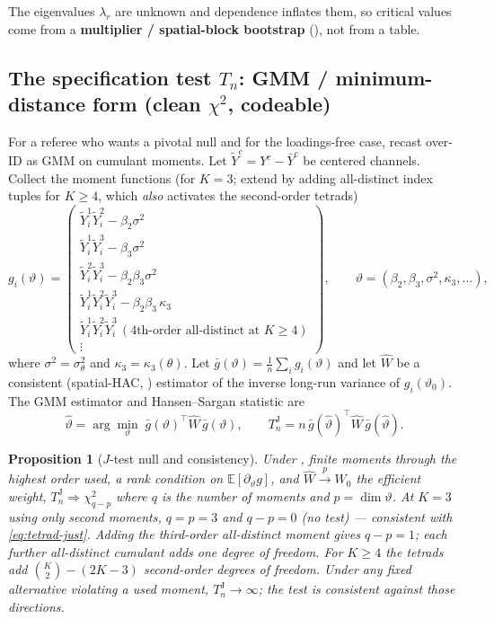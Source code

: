 \documentclass[11pt]{article}
\newtheorem{proposition}{Proposition}
\theoremstyle{definition}
\newcommand{\E}{\mathbb{E}}
\newcommand{\wto}{\Rightarrow}
\newcommand{\cyto}{\overset{p}{\to}}
\newcommand{\Th}{\theta}
\newcommand{\lat}{\Th}
\begin{document}
The eigenvalues $\lambda_r$ are unknown and dependence inflates them, so
critical values come from a \textbf{multiplier / spatial-block bootstrap}
(), not from a table.

\subsection{The specification test $T_n$: GMM / minimum-distance form
(clean $\chi^2$, codeable)}\label{sec:testGMM}

For a referee who wants a pivotal null and for the loadings-free case, recast
over-ID as GMM on cumulant moments. Let $\tilde Y^c=Y^c-\bar Y^c$ be centered
channels. Collect the moment functions (for $K=3$; extend by adding
all-distinct index tuples for $K\ge4$, which \emph{also} activates the
second-order tetrads)
\[
  g_i(\vartheta)=
  \begin{pmatrix}
   \tilde Y^1_i\tilde Y^2_i-\beta_2\sigma^2\\
   \tilde Y^1_i\tilde Y^3_i-\beta_3\sigma^2\\
   \tilde Y^2_i\tilde Y^3_i-\beta_2\beta_3\sigma^2\\
   \tilde Y^1_i\tilde Y^2_i\tilde Y^3_i-\beta_2\beta_3\,\kappa_3\\
   \tilde Y^1_i\tilde Y^2_i\tilde Y^3_i\,(\text{4th-order all-distinct at }K\ge4)\\
   \vdots
  \end{pmatrix},
  \qquad
  \vartheta=(\beta_2,\beta_3,\sigma^2,\kappa_3,\dots),
\]
where $\sigma^2=\sigma_\lat^2$ and $\kappa_3=\kappa_3(\lat)$. Let
$\bar g(\vartheta)=\frac1n\sum_i g_i(\vartheta)$ and let $\widehat W$ be a
consistent (spatial-HAC, ) estimator of the inverse
long-run variance of $g_i(\vartheta_0)$. The GMM estimator and Hansen--Sargan
statistic are
\begin{equation}\label{eq:GMM}
  \widehat\vartheta=\arg\min_{\vartheta}\;
     \bar g(\vartheta)^\top\widehat W\,\bar g(\vartheta),
  \qquad
  T_n^{\mathrm J}=n\,\bar g(\widehat\vartheta)^\top\widehat W\,
                  \bar g(\widehat\vartheta).
\end{equation}

\begin{proposition}[$J$-test null and consistency]\label{prop:J}
Under , finite moments through the highest order
used, a rank condition on $\E[\partial_\vartheta g]$, and $\widehat W\cyto W_0$
the efficient weight, $T_n^{\mathrm J}\wto\chi^2_{q-p}$ where $q$ is the number
of moments and $p=\dim\vartheta$. \emph{At $K=3$ using only second moments,
$q=p=3$ and $q-p=0$ (no test) --- consistent with \eqref{eq:tetrad-just}.}
Adding the third-order all-distinct moment gives $q-p=1$; each further
all-distinct cumulant adds one degree of freedom. For $K\ge4$ the tetrads add
$\binom K2-(2K-3)$ second-order degrees of freedom. Under any fixed alternative
violating a used moment, $T_n^{\mathrm J}\to\infty$; the test is consistent
against those directions.
\end{proposition}
\end{document}
